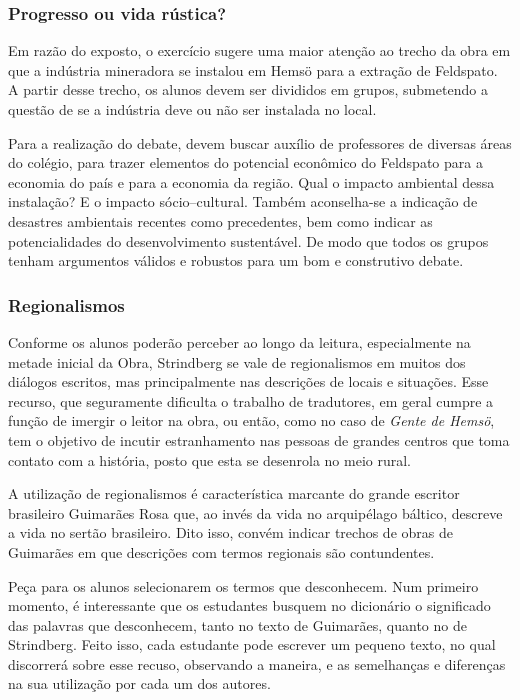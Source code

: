 \documentclass[12pt]{extarticle}
\begin{document}
\subsubsection{Progresso ou vida rústica?}

Em razão do exposto, o exercício sugere uma maior atenção ao trecho da
obra em que a indústria mineradora se instalou em Hemsö para a
extração de Feldspato. A partir desse trecho, os alunos devem ser
divididos em grupos, submetendo a questão de se a indústria deve ou
não ser instalada no local.

Para a realização do debate, devem buscar auxílio de professores de
diversas áreas do colégio, para trazer elementos do potencial econômico
do Feldspato para a economia do país e para a economia da região. Qual o
impacto ambiental dessa instalação? E o impacto sócio--cultural. Também
aconselha-se a indicação de desastres ambientais recentes como
precedentes, bem como indicar as potencialidades do desenvolvimento
sustentável. De modo que todos os grupos tenham argumentos válidos e
robustos para um bom e construtivo debate.

\subsubsection{Regionalismos}

Conforme os alunos poderão perceber ao longo da leitura, especialmente
na metade inicial da Obra, Strindberg se vale de regionalismos em
muitos dos diálogos escritos, mas principalmente nas descrições de
locais e situações. Esse recurso, que seguramente dificulta o trabalho
de tradutores, em geral cumpre a função de imergir o leitor na obra,
ou então, como no caso de \emph{Gente de Hemsö}, tem o objetivo de incutir
estranhamento nas pessoas de grandes centros que toma contato com a
história, posto que esta se desenrola no meio rural.

A utilização de regionalismos é característica marcante do grande
escritor brasileiro Guimarães Rosa que, ao invés da vida no arquipélago
báltico, descreve a vida no sertão brasileiro. Dito isso, convém indicar
trechos de obras de Guimarães em que descrições com termos regionais são
contundentes.

Peça para os alunos selecionarem os termos que desconhecem. Num primeiro
momento, é interessante que os estudantes busquem no dicionário o
significado das palavras que desconhecem, tanto no texto de Guimarães,
quanto no de Strindberg. Feito isso, cada estudante pode escrever um
pequeno texto, no qual discorrerá sobre esse recuso, observando a
maneira, e as semelhanças e diferenças na sua utilização por cada um dos
autores.
\end{document}

